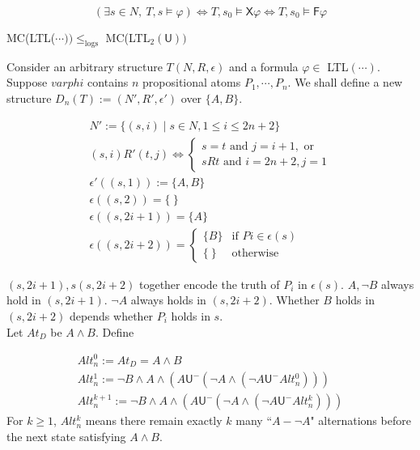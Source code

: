 \documentclass[12pt]{article}
\begin{document}
\begin{CJK*}{GBK}{song}
$$(\exists s\in N,\ T,s\models \varphi) \Longleftrightarrow T,s_0\models \textsf{X}\varphi\Longleftrightarrow T,s_0\models\textsf{F}\varphi$$


MC(LTL($\cdots))\leq_{\text{logs}}$ MC(LTL$_2(\textsf{U}))$

Consider an arbitrary structure $T(N,R,\epsilon)$ and a formula $\varphi\in$ LTL$(\cdots)$. Suppose $varphi$ contains $n$ propositional atoms $P_1,\cdots, P_n$.
We shall define a new structure $D_n(T):=(N',R',\epsilon')$ over $\{A,B\}$.

$$\begin{array}{l}
N':=\{(s,i)\mid s\in N, 1\leq i\leq 2n+2\}\\

(s,i)R'(t,j) \Longleftrightarrow\left\{\begin{array}{l}
s=t \mbox{ and } j=i+1, \mbox{ or }\\
sRt \mbox{ and } i=2n+2, j=1
\end{array}\right.\\
\epsilon'((s,1)):=\{A,B\}\\
\epsilon((s,2))=\{\ \}\\
\epsilon((s,2i+1))=\{A\}\\
\epsilon((s,2i+2))=\left\{\begin{array}{ll}
\{B\} & \mbox{if } Pi\in \epsilon(s)\\
\{\ \} & \mbox{otherwise}
\end{array}\right.
\end{array}
$$

$(s,2i+1), s(s,2i+2)$ together encode the truth of $P_i$ in $\epsilon(s)$.
%
$A, \neg B$ always hold in $(s,2i+1)$. $\neg A$ always holds in $(s,2i+2)$. Whether $B$ holds in $(s,2i+2)$ depends whether $P_i$ holds in $s$. \\


Let $At_D$ be $A\wedge B$. Define

$$\begin{array}{l}
Alt^0_n:=At_D=A\wedge B\\
Alt^1_n:=\neg B\wedge A\wedge\left(A\textsf{U}^-\left(\neg A\wedge\left(\neg A\textsf{U}^-Alt_n^0\right)\right)\right)\\
Alt^{k+1}_n:=\neg B\wedge A\wedge\left(A\textsf{U}^-\left(\neg A\wedge\left(\neg A\textsf{U}^-Alt_n^k\right)\right)\right)
\end{array}$$
%
For $k\geq 1$, $Alt^k_n$ means there remain exactly $k$ many ``$A-\neg A$" alternations before the next state satisfying $A\wedge B$.\\


\end{CJK*}
\end{document}
